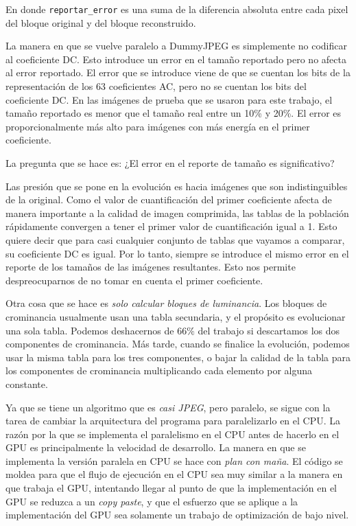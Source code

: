 En donde \verb+reportar_error+ es una suma de la diferencia absoluta entre cada
pixel del bloque original y del bloque reconstruido.

La manera en que se vuelve paralelo a DummyJPEG es simplemente no codificar al
coeficiente DC. Esto introduce un error en el tamaño reportado pero no afecta
al error reportado. El error que se introduce viene de que se cuentan los bits de
la representación de los 63 \gls{coeficientes AC}, pero no se cuentan los bits del
\gls{coeficiente DC}. En las imágenes de prueba que se usaron para este trabajo, el
tamaño reportado es menor que el tamaño real entre un 10\% y 20\%. El error es
proporcionalmente más alto para imágenes con más energía en el primer
coeficiente.

La pregunta que se hace es: ¿El error en el reporte de tamaño es significativo?

Las presión que se pone en la evolución es hacia imágenes que son
indistinguibles de la original. Como el valor de cuantificación del primer
coeficiente afecta de manera importante a la calidad de imagen comprimida, las
tablas de la población rápidamente convergen a tener el primer valor de
cuantificación igual a 1. Esto quiere decir que para casi cualquier conjunto de
tablas que vayamos a comparar, su coeficiente DC es igual. Por lo tanto,
siempre se introduce el mismo error en el reporte de los tamaños de las
imágenes resultantes. Esto nos permite despreocuparnos de no tomar en cuenta el
primer coeficiente.

Otra cosa que se hace es \emph{solo calcular bloques de luminancia}. Los
bloques de crominancia usualmente usan una tabla secundaria, y el propósito es
evolucionar una sola tabla. Podemos deshacernos de $66\%$ del trabajo si
descartamos los dos componentes de crominancia. Más tarde, cuando se finalice
la evolución, podemos usar la misma tabla para los tres componentes, o bajar la
calidad de la tabla para los componentes de crominancia multiplicando cada
elemento por alguna constante.

Ya que se tiene un algoritmo que es \emph{casi JPEG}, pero paralelo, se sigue
con la tarea de cambiar la arquitectura del programa para paralelizarlo en el
CPU. La razón por la que se implementa el paralelismo en el CPU antes de
hacerlo en el GPU es principalmente la velocidad de desarrollo. La manera en
que se implementa la versión paralela en CPU se hace con \emph{plan con maña}.
El código se moldea para que el flujo de ejecución en el CPU sea muy similar a
la manera en que trabaja el GPU, intentando llegar al punto de que la
implementación en el GPU se reduzca a un \emph{copy paste}, y que el esfuerzo
que se aplique a la implementación del GPU sea solamente un trabajo de
optimización de bajo nivel.

